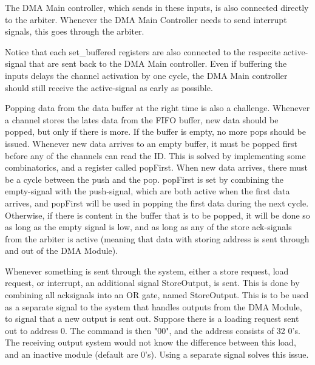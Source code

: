 \begin{appendix}
The DMA Main controller, which sends in these inputs, is also connected directly to the arbiter.
Whenever the DMA Main Controller needs to send interrupt signals, this goes through the arbiter.

Notice that each set\_buffered registers are also connected to the respecite active-signal that are sent back to the DMA Main controller.
Even if buffering the inputs delays the channel activation by one cycle, the DMA Main controller should still receive the active-signal as early as possible.

Popping data from the data buffer at the right time is also a challenge.
Whenever a channel stores the lates data from the FIFO buffer, new data should be popped, but only if there is more.
If the buffer is empty, no more pops should be issued.
Whenever new data arrives to an empty buffer, it must be popped first before any of the channels can read the ID.
This is solved by implementing some combinatorics, and a register called popFirst.
When new data arrives, there must be a cycle between the push and the pop.
popFirst is set by combining the empty-signal with the push-signal, which are both active when the first data arrives, and popFirst will be used in popping the first data during the next cycle.
Otherwise, if there is content in the buffer that is to be popped, it will be done so as long as the empty signal is low, and as long as any of the store ack-signals from the arbiter is active (meaning that data with storing address is sent through and out of the DMA Module).

Whenever something is sent through the system, either a store request, load request, or interrupt, an additional signal StoreOutput, is sent.
This is done by combining all ack\-signals into an OR gate, named StoreOutput.
This is to be used as a separate signal to the system that handles outputs from the DMA Module, to signal that a new output is sent out.
Suppose there is a loading request sent out to address 0.
The command is then "00", and the address consists of 32 0's.
The receiving output system would not know the difference between this load, and an inactive module (default are 0's).
Using a separate signal solves this issue.


\end{appendix}
